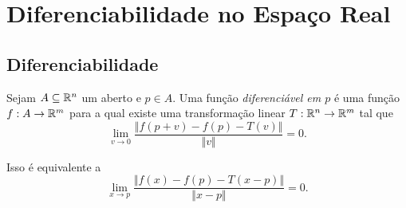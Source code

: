 \chapter{Diferenciabilidade no Espaço Real}

\section{Diferenciabilidade}

\begin{defi}
	Sejam $A \subseteq \mathbb{R}^n$ um aberto e $p \in A$. Uma função \emph{diferenciável em $p$} é uma função $f: A \to \mathbb{R}^m$ para a qual existe uma transformação linear $T : \mathbb{R}^n \to \mathbb{R}^m$ tal que
	\begin{equation*}
	\lim_{v \to 0} \frac{\Vert f(p+v)-f(p)-T(v) \Vert}{\Vert v \Vert} = 0.
	\end{equation*}
\end{defi}

Isso é equivalente a
	\begin{equation*}
	\lim_{x \to p} \frac{\Vert f(x)-f(p)-T(x-p) \Vert}{\Vert x-p \Vert} = 0.
	\end{equation*}

